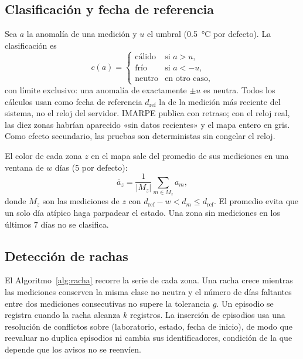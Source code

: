 \documentclass[conference,a4paper]{IEEEtran}
\begin{document}
\subsection{Clasificación y fecha de referencia}
Sea $a$ la anomalía de una medición y $u$ el umbral (\SI{0.5}{\celsius} por defecto). La clasificación es
\begin{equation}
c(a)=\begin{cases}
\text{cálido} & \text{si } a>u,\\
\text{frío} & \text{si } a<-u,\\
\text{neutro} & \text{en otro caso,}
\end{cases}
\label{eq:clas}
\end{equation}
con límite exclusivo: una anomalía de exactamente $\pm u$ es neutra. Todos los cálculos usan como fecha de referencia $d_{\mathrm{ref}}$ la de la medición más reciente del sistema, no el reloj del servidor. IMARPE publica con retraso; con el reloj real, las diez zonas habrían aparecido «sin datos recientes» y el mapa entero en gris. Como efecto secundario, las pruebas son deterministas sin congelar el reloj.

El color de cada zona $z$ en el mapa sale del promedio de sus mediciones en una ventana de $w$ días (5 por defecto):
\begin{equation}
\bar{a}_z=\frac{1}{|M_z|}\sum_{m\in M_z} a_m,
\end{equation}
donde $M_z$ son las mediciones de $z$ con $d_{\mathrm{ref}}-w<d_m\le d_{\mathrm{ref}}$.
El promedio evita que un solo día atípico haga parpadear el estado. Una zona sin mediciones en los últimos 7 días no se clasifica.

\subsection{Detección de rachas}
El Algoritmo~\ref{alg:racha} recorre la serie de cada zona. Una racha crece mientras las mediciones conserven la misma clase no neutra y el número de días faltantes entre dos mediciones consecutivas no supere la tolerancia $g$. Un episodio se registra cuando la racha alcanza $k$ registros. La inserción de episodios usa una resolución de conflictos sobre (laboratorio, estado, fecha de inicio), de modo que reevaluar no duplica episodios ni cambia sus identificadores, condición de la que depende que los avisos no se reenvíen.
\end{document}
